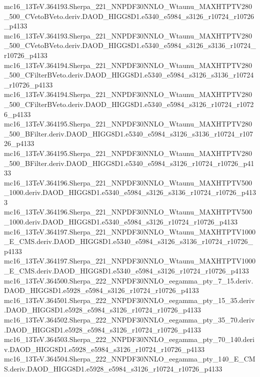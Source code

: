 \begin{scriptsize}
mc16\_13TeV.364193.Sherpa\_221\_NNPDF30NNLO\_Wtaunu\_MAXHTPTV280\_500\_CVetoBVeto.deriv.DAOD\_HIGG8D1.e5340\_e5984\_s3126\_r10724\_r10726\_p4133 \\
mc16\_13TeV.364193.Sherpa\_221\_NNPDF30NNLO\_Wtaunu\_MAXHTPTV280\_500\_CVetoBVeto.deriv.DAOD\_HIGG8D1.e5340\_e5984\_s3126\_s3136\_r10724\_r10726\_p4133 \\
mc16\_13TeV.364194.Sherpa\_221\_NNPDF30NNLO\_Wtaunu\_MAXHTPTV280\_500\_CFilterBVeto.deriv.DAOD\_HIGG8D1.e5340\_e5984\_s3126\_s3136\_r10724\_r10726\_p4133 \\
mc16\_13TeV.364194.Sherpa\_221\_NNPDF30NNLO\_Wtaunu\_MAXHTPTV280\_500\_CFilterBVeto.deriv.DAOD\_HIGG8D1.e5340\_e5984\_s3126\_r10724\_r10726\_p4133 \\
mc16\_13TeV.364195.Sherpa\_221\_NNPDF30NNLO\_Wtaunu\_MAXHTPTV280\_500\_BFilter.deriv.DAOD\_HIGG8D1.e5340\_e5984\_s3126\_s3136\_r10724\_r10726\_p4133 \\
mc16\_13TeV.364195.Sherpa\_221\_NNPDF30NNLO\_Wtaunu\_MAXHTPTV280\_500\_BFilter.deriv.DAOD\_HIGG8D1.e5340\_e5984\_s3126\_r10724\_r10726\_p4133 \\
mc16\_13TeV.364196.Sherpa\_221\_NNPDF30NNLO\_Wtaunu\_MAXHTPTV500\_1000.deriv.DAOD\_HIGG8D1.e5340\_e5984\_s3126\_s3136\_r10724\_r10726\_p4133 \\
mc16\_13TeV.364196.Sherpa\_221\_NNPDF30NNLO\_Wtaunu\_MAXHTPTV500\_1000.deriv.DAOD\_HIGG8D1.e5340\_e5984\_s3126\_r10724\_r10726\_p4133 \\
mc16\_13TeV.364197.Sherpa\_221\_NNPDF30NNLO\_Wtaunu\_MAXHTPTV1000\_E\_CMS.deriv.DAOD\_HIGG8D1.e5340\_e5984\_s3126\_s3136\_r10724\_r10726\_p4133 \\
mc16\_13TeV.364197.Sherpa\_221\_NNPDF30NNLO\_Wtaunu\_MAXHTPTV1000\_E\_CMS.deriv.DAOD\_HIGG8D1.e5340\_e5984\_s3126\_r10724\_r10726\_p4133 \\
mc16\_13TeV.364500.Sherpa\_222\_NNPDF30NNLO\_eegamma\_pty\_7\_15.deriv.DAOD\_HIGG8D1.e5928\_e5984\_s3126\_r10724\_r10726\_p4133 \\
mc16\_13TeV.364501.Sherpa\_222\_NNPDF30NNLO\_eegamma\_pty\_15\_35.deriv.DAOD\_HIGG8D1.e5928\_e5984\_s3126\_r10724\_r10726\_p4133 \\
mc16\_13TeV.364502.Sherpa\_222\_NNPDF30NNLO\_eegamma\_pty\_35\_70.deriv.DAOD\_HIGG8D1.e5928\_e5984\_s3126\_r10724\_r10726\_p4133 \\
mc16\_13TeV.364503.Sherpa\_222\_NNPDF30NNLO\_eegamma\_pty\_70\_140.deriv.DAOD\_HIGG8D1.e5928\_e5984\_s3126\_r10724\_r10726\_p4133 \\
mc16\_13TeV.364504.Sherpa\_222\_NNPDF30NNLO\_eegamma\_pty\_140\_E\_CMS.deriv.DAOD\_HIGG8D1.e5928\_e5984\_s3126\_r10724\_r10726\_p4133 \\

\end{scriptsize}
